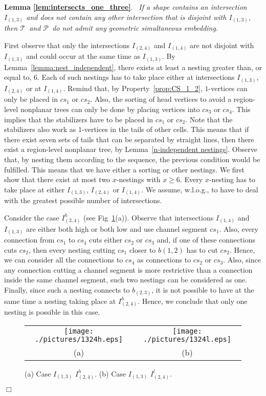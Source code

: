 \documentclass[a4paper,10pt]{llncs}
\newcounter{prop}
\renewenvironment{proof}
{{\bf Proof:}}{\hspace*{\fill}$\Box$\par\vspace{2mm}}
\newcommand{\rephrase}[3]{\noindent\textbf{#1 #2}.~\emph{#3}}
\newcommand{\T}{\mbox{$\mathcal T$ }}
\renewcommand{\P}{\mbox{$\mathcal P$ }}
\begin{document}
\rephrase{Lemma}{\ref{lem:intersects_one_three}}{
If a shape contains an intersection $I_{(1,3)}$ and does not contain any other intersection that is disjoint with $I_{(1,3)}$, then \T and \P do not admit any geometric simultaneous embedding.
}

\begin{proof}
First observe that only the intersections $I_{(2,4)}$ and $I_{(1,4)}$ are not disjoint with $I_{(1,3)}$ and could occur at the same time as $I_{(1,3)}$. By Lemma~\ref{lemma:nest_independent}, there exists at least a nesting greater than, or equal to, 6. Each of such nestings has to take place either at intersections $I_{(1,3)}$, $I_{(2,4)}$ or at $I_{(1,4)}$. Remind that, by Property~\ref{prop:CS_1_2}, $1$-vertices can only be placed in $cs_1$ or $cs_2$. Also, the sorting of head vertices to avoid a region-level nonplanar trees can only be done by placing vertices into $cs_3$ or $cs_4$. This implies that the stabilizers have to be placed in $cs_1$ or $cs_2$. Note that the stabilizers also work as $1$-vertices in the tails of other cells. This means that if there exist seven sets of tails that can be separated by straight lines, then there exist a region-level nonplanar tree, by Lemma~\ref{n-independent nestings}.
Observe that, by nesting them according to the sequence, the previous condition would be fulfilled.
This means that we have either a sorting or other nestings. We first show that there exist at most two $x$-nestings with $x \geq 6$. Every $x$-nesting has to take place at either $I_{(1,3)}$, $I_{(2,4)}$ or $I_{(1,4)}$. We assume, w.l.o.g., to have to deal with the greatest possible number of intersections.

Consider the case $I_{(2,4)}^h$ (see Fig~\ref{fig:1324}(a)). Observe that intersections $I_{(1,4)}$ and $I_{(1,3)}$ are either both high or both low and use channel segment $cs_1$. Also, every connection from $cs_1$ to $cs_4$ cuts either $cs_2$ or $cs_3$ and, if one of these connections cuts $cs_2$, then every nesting cutting $cs_1$ closer to $b(1,2)$ has to cut $cs_2$. Hence, we can consider all the connections to $cs_4$ as connections to $cs_2$ or $cs_3$. Also, since any connection cutting a channel segment is more restrictive than a connection inside the same channel segment, such two nestings can be considered as one. Finally, since such a nesting connects to $b_{(2,3)}$, it is not possible to have at the same time a nesting taking place at $I_{(2,4)}^h$. Hence, we conclude that only one nesting is possible in this case.

\begin{figure}[ht]
\begin{center}
\begin{tabular}{c c}
\mbox{\texttt{[image: ./pictures/1324h.eps]}} \hspace{0.1cm} &
\mbox{\texttt{[image: ./pictures/1324l.eps]}} \\
(a) & (b)\\
\end{tabular}
\caption{(a) Case $I_{(1,3)}$ $I_{(2,4)}^h$. (b) Case $I_{(1,3)}$ $I_{(2,4)}^l$.}
\label{fig:1324}
\end{center}
\end{figure}


\end{proof}
\end{document}
